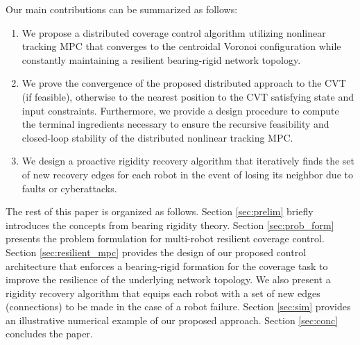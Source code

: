 Our main contributions can be summarized as follows: 
\begin{enumerate}
    \item We propose a distributed coverage control algorithm utilizing nonlinear tracking MPC that converges to the centroidal Voronoi configuration while constantly maintaining a resilient bearing-rigid network topology.
    \item We prove the convergence of the proposed distributed approach to the CVT (if feasible), otherwise to the nearest position to the CVT satisfying state and input constraints. Furthermore, we provide a design procedure to compute the terminal ingredients necessary to ensure the recursive feasibility and closed-loop stability of the distributed nonlinear tracking MPC.  
    \item We design a proactive rigidity recovery algorithm that iteratively finds the set of new recovery edges for each robot in the event of losing its neighbor due to faults or cyberattacks. 
\end{enumerate}

The rest of this paper is organized as follows. Section \ref{sec:prelim} briefly introduces the concepts from bearing rigidity theory. Section \ref{sec:prob_form} presents the problem formulation for multi-robot resilient coverage control. Section \ref{sec:resilient_mpc} provides the design of our proposed control architecture that enforces a bearing-rigid formation for the coverage task to improve the resilience of the underlying network topology. We also present a rigidity recovery algorithm that equips each robot with a set of new edges (connections) to be made in the case of a robot failure. Section \ref{sec:sim} provides an illustrative numerical example of our proposed approach. Section \ref{sec:conc} concludes the paper.

